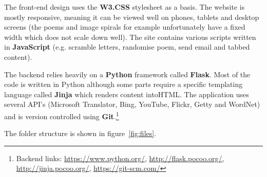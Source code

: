 The front-end design uses the \textbf{W3.CSS} stylesheet as a basis. The website is mostly responsive, meaning it can be viewed well on phones, tablets and desktop screens (the poems and image spirals for example unfortunately have a fixed width which does not scale down well). The site contains various scripts written in \textbf{JavaScript} (e.g. scramble letters, randomise poem, send email and tabbed content).

The backend relies heavily on a \textbf{Python} framework called \textbf{Flask}. Most of the code is written in Python although some parts require a specific templating language called \textbf{Jinja} which renders content into\ac{HTML}. The application uses several \acs{API}'s (Microsoft Translator, Bing, YouTube, Flickr, Getty and WordNet) and is version controlled using \textbf{Git}.\footnote{Backend links: \url{https://www.python.org/}, \url{http://flask.pocoo.org/}, \url{http://jinja.pocoo.org/}, \url{https://git-scm.com/}}

The folder structure is shown in figure~\ref{fig:files}.

